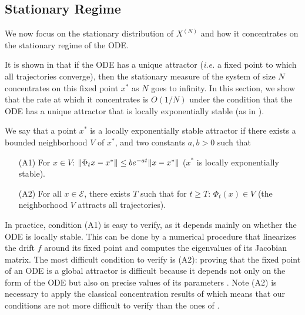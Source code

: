 \documentclass[acmlarge]{acmart}
\newcommand\XN{X^{(N)}}
\newcommand\E{\mathcal{E}}
\newcommand\norm[1]{{\mathchoice{\bnorm{#1}}{\snorm{#1}}{\snorm{#1}}{\snorm{#1}}}}
\newcommand\bnorm[1]{\left\|#1\right\|}
\newcommand\snorm[1]{\|#1\|}
\begin{document}
\subsection{Stationary Regime}
\label{sec:steady}

We now focus on the stationary distribution of $\XN$ and how it
concentrates on the stationary regime of the ODE.

It is shown in \cite{benaim2008class} that if the ODE has a unique
attractor (\emph{i.e.} a fixed point to which all trajectories
converge), then the stationary measure of the system of size $N$
concentrates on this fixed point $x^*$ as $N$ goes to infinity.  In
this section, we show that the rate at which it concentrates is
$O(1/N)$ under the condition that the ODE has a unique attractor that
is locally exponentially stable (as in \cite{ying2016rate}).

We say that a point $x^*$ is a locally exponentially stable attractor
if there exists a bounded neighborhood $V$ of $x^*$, and two constants
$a,b>0$ such that
\begin{itemize}
\item[(A1)] For $x\in V$:
  $\norm{\Phi_tx-x^*}\le be^{-at}\norm{x-x^*}$ ($x^*$ is locally
  exponentially stable).
\item[(A2)] For all $x\in\E$, there exists $T$ such that for $t\ge T$:
  $\Phi_{t}(x)\in V$ (the neighborhood $V$ attracts all trajectories).
\end{itemize}
In practice, condition (A1) is easy to verify, as it depends mainly on
whether the ODE is locally stable. This can be done by a numerical
procedure that linearizes the drift $f$ around its fixed point and
computes the eigenvalues of its Jacobian matrix. The most difficult
condition to verify is (A2): proving that the fixed point of an ODE is
a global attractor is difficult because it depends not only on the
form of the ODE but also on precise values of its parameters
\cite{benaim2008class,cho2010validity}.  Note (A2) is necessary to
apply the classical concentration results of \cite{benaim2008class}
which means that our conditions are not more difficult to verify than
the ones of \cite{benaim2008class}.
\end{document}
